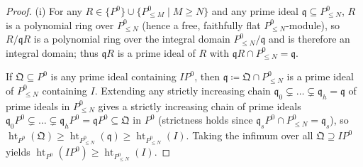 \documentclass[a4paper, 12pt, reqno]{amsart}
\theoremstyle{remark}
\begin{document}
\begin{proof}
  (i) For any $R \in \{P^0\} \cup \{P^0_{\le M} \mid M \ge N\}$ and any prime ideal $\mathfrak{q} \subseteq P^0_{\le N}$,
  $R$ is a polynomial ring over $P^0_{\le N}$ (hence a free, faithfully flat $P^0_{\le N}$-module),
  so $R / \mathfrak{q} R$ is a polynomial ring over the integral domain $P^0_{\le N} / \mathfrak{q}$ and is therefore an integral domain;
  thus $\mathfrak{q} R$ is a prime ideal of $R$ with $\mathfrak{q} R \cap P^0_{\le N} = \mathfrak{q}$.

  If $\mathfrak{Q} \subseteq P^0$ is any prime ideal containing $I P^0$,
  then $\mathfrak{q} \coloneq \mathfrak{Q} \cap P^0_{\le N}$ is a prime ideal of $P^0_{\le N}$ containing $I$.
  Extending any strictly increasing chain $\mathfrak{q}_0 \subsetneq \dots \subsetneq \mathfrak{q}_h = \mathfrak{q}$ of prime ideals in $P^0_{\le N}$ gives a strictly increasing chain of prime ideals $\mathfrak{q}_0 P^0 \subsetneq \dots \subsetneq \mathfrak{q}_h P^0 = \mathfrak{q} P^0 \subseteq \mathfrak{Q}$ in $P^0$
  (strictness holds since $\mathfrak{q}_s P^0 \cap P^0_{\le N} = \mathfrak{q}_s$),
  so $\operatorname{ht}_{P^0}(\mathfrak{Q}) \ge \operatorname{ht}_{P^0_{\le N}}(\mathfrak{q}) \ge \operatorname{ht}_{P^0_{\le N}}(I)$.
  Taking the infimum over all $\mathfrak{Q} \supseteq I P^0$ yields $\operatorname{ht}_{P^0}(I P^0) \ge \operatorname{ht}_{P^0_{\le N}}(I)$.


\end{proof}
\end{document}
